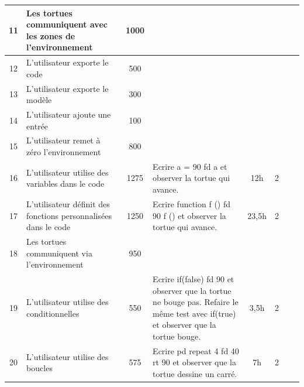 {\begin{longtable}[c]{|c|p{1.3cm}|c|p{3.5cm}|*{3}{c|}p{0.7cm}|}
\hline
11 & Les tortues communiquent avec les zones de l'environnement & 1000 &  &  &  &  &  \\
\hline
12 & L'utilisateur exporte le code & 500 &  &  &  &  &  \\
\hline
13 & L'utilisateur exporte le modèle & 300 &  &  &  &  &  \\
\hline
14 & L'utilisateur ajoute une entrée & 100 &  &  &  &  &  \\
\hline
15 & L'utilisateur remet à zéro l'environnement & 800 &  &  &  &  &  \\
\hline
16 & L'utilisateur utilise des variables dans le code & 1275 & Ecrire a = 90 fd a et observer la tortue qui avance. & 12h & 2 &  &  \\
\hline
17 & L'utilisateur définit des fonctions personnalisées dans le code & 1250 & Ecrire function f () { fd 90 } f () et observer la tortue qui avance. & 23,5h & 2 & &  \\
\hline
18 & Les tortues communiquent via l'environnement & 950 &  &  &  &  &  \\
\hline
19 & L'utilisateur utilise des conditionnelles & 550 & Ecrire if(false) { fd 90 } et observer que la tortue ne bouge pas. Refaire le même test avec if(true) et observer que la tortue bouge. & 3,5h & 2 &  &  \\
\hline
20 & L'utilisateur utilise des boucles & 575 & Ecrire pd repeat 4 { fd 40 rt 90 } et observer que la tortue dessine un carré. & 7h & 2 &  &  \\
\hline
\end{longtable}}
